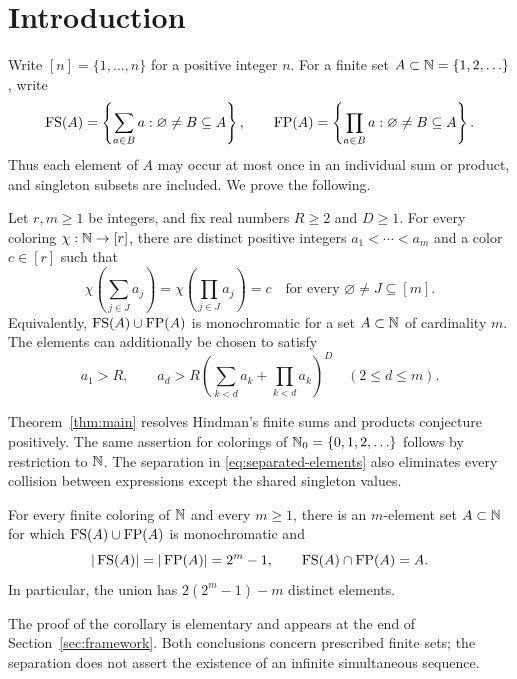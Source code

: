 \section{Introduction}\label{sec:introduction}

Write $[n]=\{1,\ldots,n\}$ for a positive integer $n$.
For a finite set $A\subset\mathbb N=\{1,2,\ldots\}$, write
\[
 \operatorname{FS}(A)=\left\{\sum_{a\in B}a:\varnothing\ne B\subseteq A\right\},
 \qquad
 \operatorname{FP}(A)=\left\{\prod_{a\in B}a:\varnothing\ne B\subseteq A\right\}.
\]
Thus each element of $A$ may occur at most once in an individual sum
or product, and singleton subsets are included. We prove the following.

\begin{theorem}\label{thm:main}
Let $r,m\ge1$ be integers, and fix real numbers $R\ge2$ and $D\ge1$.
For every coloring $\chi:\mathbb N\to[r]$,
there are distinct positive integers $a_1<\cdots<a_m$ and a color
$c\in[r]$ such that
\[
 \chi\left(\sum_{j\in J}a_j\right)
 =\chi\left(\prod_{j\in J}a_j\right)=c
 \quad\text{for every }\varnothing\ne J\subseteq[m].
\]
Equivalently, $\operatorname{FS}(A)\cup\operatorname{FP}(A)$ is monochromatic for a set
$A\subset\mathbb N$ of cardinality $m$.
The elements can additionally be chosen to satisfy
\begin{equation}\label{eq:separated-elements}
 a_1>R,\qquad
 a_d>R\left(\sum_{k<d}a_k+\prod_{k<d}a_k\right)^D
 \quad(2\le d\le m).
\end{equation}
\end{theorem}

Theorem~\ref{thm:main} resolves Hindman's finite sums and products
conjecture positively. The same assertion for colorings of
$\mathbb N_0=\{0,1,2,\ldots\}$ follows by restriction to $\mathbb N$.
The separation in \eqref{eq:separated-elements} also eliminates every
collision between expressions except the shared singleton values.

\begin{corollary}\label{cor:distinct-expressions}
For every finite coloring of $\mathbb N$ and every $m\ge1$, there is an
$m$-element set $A\subset\mathbb N$ for which $\operatorname{FS}(A)\cup\operatorname{FP}(A)$ is
monochromatic and
\[
 |\operatorname{FS}(A)|=|\operatorname{FP}(A)|=2^m-1,\qquad \operatorname{FS}(A)\cap\operatorname{FP}(A)=A.
\]
In particular, the union has $2(2^m-1)-m$ distinct elements.
\end{corollary}

The proof of the corollary is elementary and appears at the end of
Section~\ref{sec:framework}. Both conclusions concern prescribed
finite sets; the separation does not assert the existence of an
infinite simultaneous sequence.

